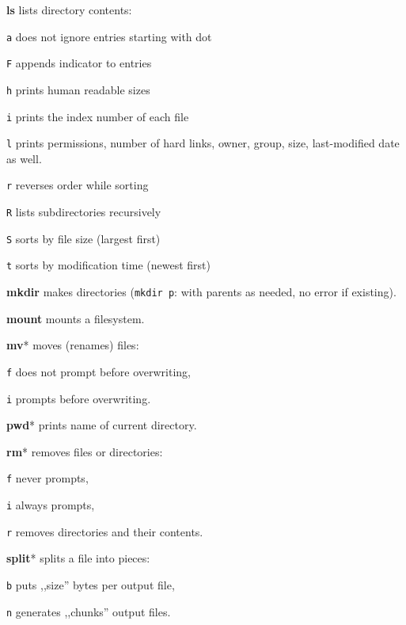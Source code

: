 \manualbreak

\textbf{ls} lists directory contents:
\begin{enumx}
	\item [\texttt{a}] does not ignore entries starting with dot
	\item [\texttt{F}] appends indicator to entries
	\item [\texttt{h}] prints human readable sizes
	\item [\texttt{i}] prints the index number of each file
	\item [\texttt{l}] prints permissions, number of hard links, owner, group, size, last-modified date as well.
	\item [\texttt{r}] reverses order while sorting
	\item [\texttt{R}] lists subdirectories recursively
	\item [\texttt{S}] sorts by file size (largest first)
	\item [\texttt{t}] sorts by modification time (newest first)
\end{enumx}

\manualbreak

\textbf{mkdir} makes directories (\texttt{mkdir p}: with parents as needed, no
error if existing).

\textbf{mount} mounts a filesystem.

\textbf{mv}* moves (renames) files:
\begin{enumx}
	\item [\texttt{f}] does not prompt before overwriting,
	\item [\texttt{i}] prompts before overwriting.
\end{enumx}

\textbf{pwd}* prints name of current directory.

\textbf{rm}* removes files or directories:
\begin{enumx}
	\item [\texttt{f}] never prompts,
	\item [\texttt{i}] always prompts,
	\item [\texttt{r}] removes directories and their contents.
\end{enumx}


\textbf{split}* splits a file into pieces:
\begin{enumx}
	\item [\texttt{b}] puts ,,size'' bytes per output file,
	\item [\texttt{n}] generates ,,chunks'' output files.
\end{enumx}

